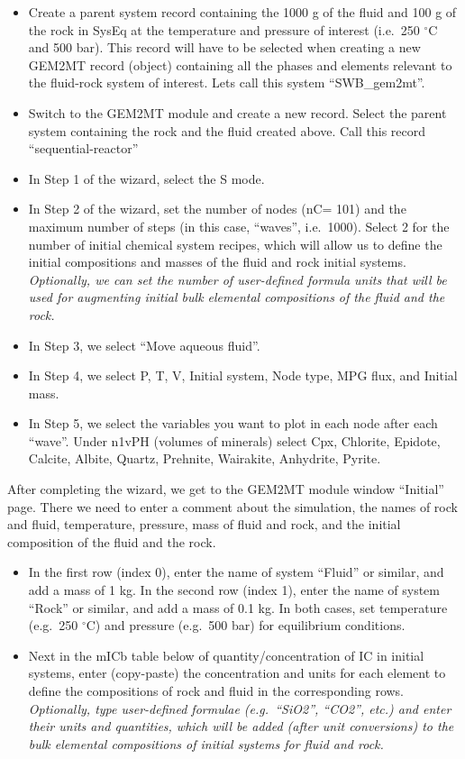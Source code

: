 \documentclass[
]{book}
\begin{document}
\begin{itemize}
\item
  Create a parent system record containing the 1000 g of the fluid and 100 g of the rock in SysEq at the temperature and pressure of interest (i.e.~250 \(^{\circ}\)C and 500 bar). This record will have to be selected when creating a new GEM2MT record (object) containing all the phases and elements relevant to the fluid-rock system of interest. Lets call this system ``SWB\_gem2mt''.
\item
  Switch to the GEM2MT module and create a new record. Select the parent system containing the rock and the fluid created above. Call this record ``sequential-reactor''
\item
  In Step 1 of the wizard, select the S mode.
\item
  In Step 2 of the wizard, set the number of nodes (nC= 101) and the maximum number of steps (in this case, ``waves'', i.e.~1000). Select 2 for the number of initial chemical system recipes, which will allow us to define the initial compositions and masses of the fluid and rock initial systems. \emph{Optionally, we can set the number of user-defined formula units that will be used for augmenting initial bulk elemental compositions of the fluid and the rock.}
\item
  In Step 3, we select ``Move aqueous fluid''.
\item
  In Step 4, we select P, T, V, Initial system, Node type, MPG flux, and Initial mass.
\item
  In Step 5, we select the variables you want to plot in each node after each ``wave''. Under n1vPH (volumes of minerals) select Cpx, Chlorite, Epidote, Calcite, Albite, Quartz, Prehnite, Wairakite, Anhydrite, Pyrite.
\end{itemize}

After completing the wizard, we get to the GEM2MT module window ``Initial'' page. There we need to enter a comment about the simulation, the names of rock and fluid, temperature, pressure, mass of fluid and rock, and the initial composition of the fluid and the rock.

\begin{itemize}
\item
  In the first row (index 0), enter the name of system ``Fluid'' or similar, and add a mass of 1 kg. In the second row (index 1), enter the name of system ``Rock'' or similar, and add a mass of 0.1 kg. In both cases, set temperature (e.g.~250 \(^{\circ}\)C) and pressure (e.g.~500 bar) for equilibrium conditions.
\item
  Next in the mICb table below of quantity/concentration of IC in initial systems, enter (copy-paste) the concentration and units for each element to define the compositions of rock and fluid in the corresponding rows. \emph{Optionally, type user-defined formulae (e.g.~``SiO2'', ``CO2'', etc.) and enter their units and quantities, which will be added (after unit conversions) to the bulk elemental compositions of initial systems for fluid and rock.}
\end{itemize}
\end{document}
